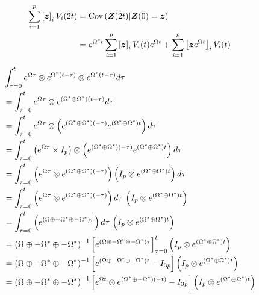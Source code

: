 \documentclass{article}
\begin{document}
\begin{align}
    \sum_{i=1}^p \left[\boldsymbol{z}\right]_i V_i(2t) &= \mathrm{Cov}\left(\boldsymbol{Z}(2t)|\boldsymbol{Z}(0)=\boldsymbol{z}\right) 
    \\&=e^{\Omega^{*} t}\sum_{i=1}^p \left[\boldsymbol{z}\right]_i V_{i}(t)e^{\Omega t}
    + \sum_{i=1}^p \left[\boldsymbol{z}e^{\Omega t}\right]_i V_i(t)
\end{align}

\begin{align}
    &\int_{\tau=0}^t \Exp{\Omega \tau} \otimes \Exp{\Omega\tr(t-\tau)} \otimes \Exp{\Omega\tr(t-\tau)} d \tau
    \\&=\int_{\tau=0}^t \Exp{\Omega \tau} \otimes \Exp{\left(\Omega\tr \oplus \Omega\tr\right)(t-\tau)} d \tau
    \\&=\int_{\tau=0}^t \Exp{\Omega \tau} \otimes \left(\Exp{\left(\Omega\tr \oplus \Omega\tr\right)(-\tau)}\Exp{\left(\Omega\tr \oplus \Omega\tr\right)t}\right) d \tau \,  
    \\&=\int_{\tau=0}^t \left(\Exp{\Omega \tau}\times I_p \right)\otimes \left(\Exp{\left(\Omega\tr \oplus \Omega\tr\right)(-\tau)}\Exp{\left(\Omega\tr \oplus \Omega\tr\right)t}\right) d \tau \,  
    \\&=\int_{\tau=0}^t \left(\Exp{\Omega \tau}\otimes \Exp{\left(\Omega\tr \oplus \Omega\tr\right)(-\tau)} \right)\left(I_p \otimes \Exp{\left(\Omega\tr \oplus \Omega\tr\right)t}\right) d \tau \,  
    \\&=\int_{\tau=0}^t \left(\Exp{\Omega \tau}\otimes \Exp{\left(\Omega\tr \oplus \Omega\tr\right)(-\tau)} \right) d \tau \,  \left(I_p \otimes \Exp{\left(\Omega\tr \oplus \Omega\tr\right)t}\right)
    \\&=\int_{\tau=0}^t \left(\Exp{\left(\Omega \oplus -\Omega\tr \oplus -\Omega\tr\right)\tau} \right) d \tau \,  \left(I_p \otimes \Exp{\left(\Omega\tr \oplus \Omega\tr\right)t}\right)
    \\&=\left(\Omega \oplus -\Omega\tr \oplus -\Omega\tr\right)^{-1} \left[\Exp{\left(\Omega \oplus -\Omega\tr \oplus -\Omega\tr\right)\tau} \right]_{\tau=0}^t \left(I_p \otimes \Exp{\left(\Omega\tr \oplus \Omega\tr\right)t}\right)
    \\&=\left(\Omega \oplus -\Omega\tr \oplus -\Omega\tr\right)^{-1} \left[\Exp{\left(\Omega \oplus -\Omega\tr \oplus -\Omega\tr\right)t}-I_{3p} \right] \left(I_p \otimes \Exp{\left(\Omega\tr \oplus \Omega\tr\right)t}\right)
    \\&=\left(\Omega \oplus -\Omega\tr \oplus -\Omega\tr\right)^{-1} \left[\Exp{\Omega t} \otimes \Exp{\left(\Omega\tr \oplus -\Omega\tr\right)(-t)}-I_{3p} \right] \left(I_p \otimes \Exp{\left(\Omega\tr \oplus \Omega\tr\right)t}\right)

\end{align}
\end{document}
